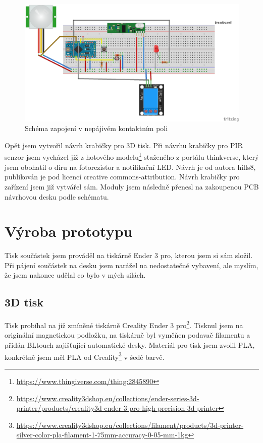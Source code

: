 \documentclass[11pt,a4paper,twoside,openright]{report}
\begin{document}
	
	\begin{figure}[htb]
		\centering
		\includegraphics[width=1\hsize]{img/přijímač_zásuvka_bb.png}
		\caption{Schéma zapojení v nepájivém kontaktním poli}\end{figure}
	
	Opět jsem vytvořil návrh krabičky pro 3D tisk. Při návrhu krabičky pro PIR senzor jsem vycházel již z hotového modelu\footnote{\url{https://www.thingiverse.com/thing:2845890}} staženého z portálu thinkverse, který jsem obohatil o díru na fotorezistor a notifikační LED. Návrh je od autora hills8, publikován je pod licencí creative commons-attribution. Návrh krabičky pro zařízení jsem již vytvářel sám. Moduly jsem následně přenesl na zakoupenou PCB návrhovou desku podle schématu.
	
	
	\section{Výroba prototypu}
	
	Tisk součástek jsem prováděl na tiskárně Ender 3 pro, kterou jsem si sám složil. Při pájení součástek na desku jsem narážel na nedostatečné vybavení, ale myslím, že jsem nakonec udělal co bylo v mých silách. 
	
	\subsection{3D tisk}
	
	Tisk probíhal na již zmíněné tiskárně Creality Ender 3 pro\footnote{\url{https://www.creality3dshop.eu/collections/ender-series-3d-printer/products/creality3d-ender-3-pro-high-precision-3d-printer}}. Tisknul jsem na originální magnetickou podložku, na tiskárně byl vyměňen podavač filamentu a přidán BLtouch zajišťující automatické  desky. Materiál pro tisk jsem zvolil PLA, konkrétně jsem měl PLA od Creality\footnote{\url{https://www.creality3dshop.eu/collections/filament/products/3d-printer-silver-color-pla-filament-1-75mm-accuracy-0-05-mm-1kg}} v šedé barvě.
	
\end{document}
